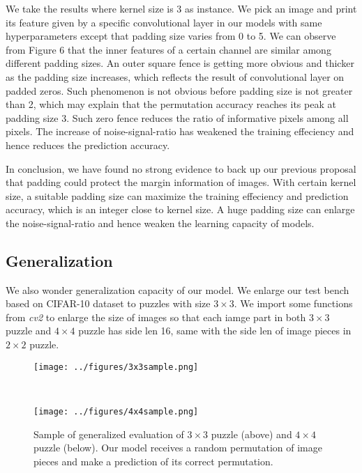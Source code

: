 \documentclass[twocolumn]{article}
\begin{document}
We take the results where kernel size is 3 as instance. We pick an image and print its feature given by a 
specific convolutional layer in our models with same hyperparameters except that padding size varies from 
0 to 5. We can observe from Figure 6 that the inner features of a certain channel are similar among different 
padding sizes. An outer square fence is getting more obvious and thicker as the padding size increases, which 
reflects the result of convolutional layer on padded zeros. Such phenomenon is not obvious before padding size 
is not greater than 2, which may explain that the permutation accuracy reaches its peak at padding size 3. 
Such zero fence reduces the ratio of informative pixels among all pixels. The increase of noise-signal-ratio 
has weakened the training effeciency and hence reduces the prediction accuracy. 

In conclusion, we have found no strong evidence to back up our previous proposal that padding could protect 
the margin information of images. With certain kernel size, a suitable padding size can maximize the training 
effeciency and prediction accuracy, which is an integer close to kernel size. A huge padding size can enlarge 
the noise-signal-ratio and hence weaken the learning capacity of models. 
\subsection{Generalization}
We also wonder generalization capacity of our model. We enlarge our test bench based on CIFAR-10 dataset to 
puzzles with size $3\times 3$. We import some functions from \textit{cv2} to enlarge the size of images so 
that each iamge part in both $3\times 3$ puzzle and $4\times 4$ puzzle has side len 16, same with the side len 
of image pieces in $2\times 2$ puzzle. 
\begin{figure}[h]
    \centering
    \begin{minipage}{1\linewidth}
        \centering
        \texttt{[image: ../figures/3x3sample.png]}
    \end{minipage}
    \\
    \begin{minipage}{1\linewidth}
        \centering
        \texttt{[image: ../figures/4x4sample.png]}
    \end{minipage}
    \caption{Sample of generalized evaluation of $3\times 3$ puzzle (above) and $4\times 4$ puzzle (below). 
    Our model receives a random permutation of image pieces and make a prediction of its correct permutation. }
\end{figure}
\end{document}
